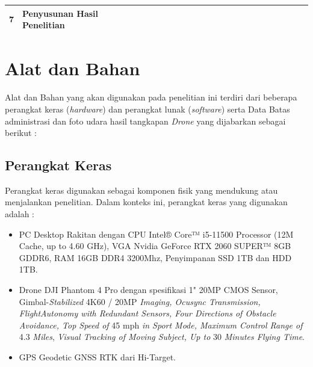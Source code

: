 \begin{table}[H]
{\begin{tabular}{|c|l|llll|llll|llll|llll|llll|llll|}
  7                    & Penyusunan Hasil Penelitian                  & \multicolumn{1}{l|}{}                         & \multicolumn{1}{l|}{}                         & \multicolumn{1}{l|}{}                         &                          & \multicolumn{1}{l|}{}                         & \multicolumn{1}{l|}{}                         & \multicolumn{1}{l|}{}                         &                          & \multicolumn{1}{l|}{}                         & \multicolumn{1}{l|}{}                         & \multicolumn{1}{l|}{}                         &                          & \multicolumn{1}{l|}{}                        & \multicolumn{1}{l|}{}                        & \multicolumn{1}{l|}{} & & \multicolumn{1}{l|}{} & \multicolumn{1}{l|}{} & \multicolumn{1}{l|}{} & & \multicolumn{1}{l|}{\cellcolor[HTML]{656565} }                         & \multicolumn{1}{l|}{\cellcolor[HTML]{656565} }                         & \multicolumn{1}{l|}{\cellcolor[HTML]{656565} }                         &                          \cellcolor[HTML]{656565} \\ \hline
  \end{tabular}%
  }
  \end{table}

\section{Alat dan Bahan}

Alat dan Bahan yang akan digunakan pada penelitian ini terdiri dari beberapa
perangkat keras (\textit{hardware}) dan perangkat lunak (\textit{software}) serta Data Batas administrasi dan foto udara hasil tangkapan \textit{Drone} yang dijabarkan sebagai berikut :

\subsection{Perangkat Keras}

Perangkat keras digunakan sebagai komponen fisik yang mendukung atau menjalankan penelitian. Dalam konteks ini, perangkat keras yang digunakan adalah :

\begin{itemize}
	\item PC Desktop Rakitan dengan CPU Intel® Core™ i5-11500 Processor (12M Cache, up to 4.60 GHz), VGA Nvidia GeForce RTX 2060 SUPER™ 8GB GDDR6, RAM 16GB DDR4 3200Mhz, Penyimpanan SSD 1TB dan HDD 1TB.
    \item Drone DJI Phantom 4 Pro dengan spesifikasi 1" 20MP CMOS Sensor, Gimbal-\textit{Stabilized} 4K60 / 20MP \textit{Imaging, Ocusync Transmission, FlightAutonomy with Redundant Sensors, Four Directions of Obstacle Avoidance, Top Speed of} 45 mph \textit{in Sport Mode, Maximum Control Range of} 4.3 \textit{Miles}, \textit{Visual Tracking of Moving Subject, Up to} 30 \textit{Minutes Flying Time}.
    \item  GPS Geodetic GNSS RTK dari Hi-Target.
	\end{itemize}

